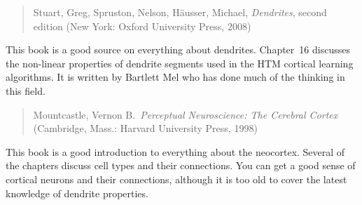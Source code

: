 \begin{quote}
Stuart, Greg, Spruston, Nelson, H\"ausser, Michael, {\em Dendrites},
second edition (New York: Oxford University Press, 2008)
\end{quote}

This book is a good source on everything about dendrites. Chapter~16
discusses the non-linear properties of dendrite segments used in the
HTM cortical learning algorithms. It is written by Bartlett Mel who
has done much of the thinking in this field.

\begin{quote}
Mountcastle, Vernon B.~{\em Perceptual Neuroscience: The Cerebral
  Cortex} (Cambridge, Mass.: Harvard University Press, 1998)
\end{quote}

This book is a good introduction to everything about the
neocortex. Several of the chapters discuss cell types and their
connections. You can get a good sense of cortical neurons and their
connections, although it is too old to cover the latest knowledge of
dendrite properties.
